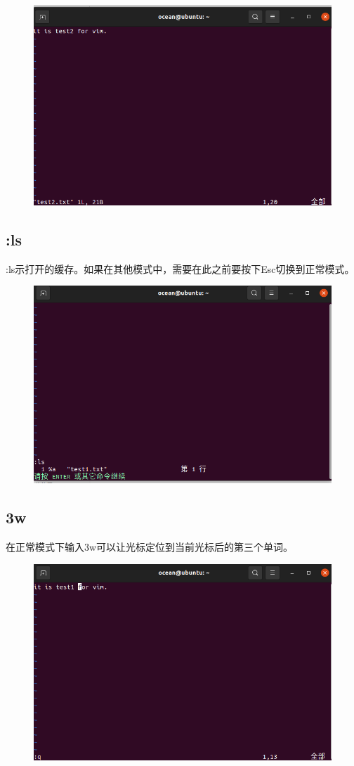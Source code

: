\documentclass{article}
\begin{document}
\begin{figure}[H]
    \centering
    \includegraphics[width=1\linewidth]{e2.png}
\end{figure}

\subsection{:ls}
:ls示打开的缓存。如果在其他模式中，需要在此之前要按下Esc切换到正常模式。
\begin{figure}[H]
    \centering
    \includegraphics[width=1\linewidth]{ls_tool.png}
\end{figure}

\subsection{3w}
在正常模式下输入3w可以让光标定位到当前光标后的第三个单词。
\begin{figure}[H]
    \centering
    \includegraphics[width=1\linewidth]{3w.png}
\end{figure}
\end{document}
